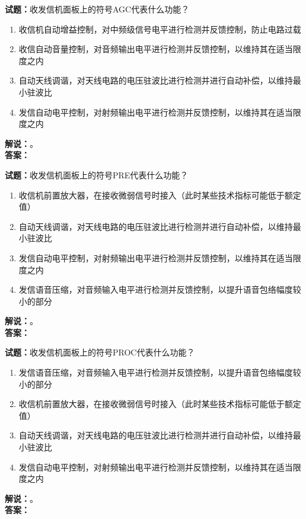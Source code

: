 \documentclass{ctexbook}
\begin{document}
\vspace{\baselineskip}

\noindent\textbf{试题：}收发信机面板上的符号AGC代表什么功能？
\begin{enumerate}[leftmargin=3em]
  \item 收信机自动增益控制，对中频级信号电平进行检测并反馈控制，防止电路过载
  \item 收信自动音量控制，对音频输出电平进行检测并反馈控制，以维持其在适当限度之内
  \item 自动天线调谐，对天线电路的电压驻波比进行检测并进行自动补偿，以维持最小驻波比
  \item 发信自动电平控制，对射频输出电平进行检测并反馈控制，以维持其在适当限度之内
\end{enumerate}
\noindent\textbf{解说：}\textbf{}。\\\noindent\textbf{答案：}

\vspace{\baselineskip}

\noindent\textbf{试题：}收发信机面板上的符号PRE代表什么功能？
\begin{enumerate}[leftmargin=3em]
  \item 收信机前置放大器，在接收微弱信号时接入（此时某些技术指标可能低于额定值）
  \item 自动天线调谐，对天线电路的电压驻波比进行检测并进行自动补偿，以维持最小驻波比
  \item 发信自动电平控制，对射频输出电平进行检测并反馈控制，以维持其在适当限度之内
  \item 发信语音压缩，对音频输入电平进行检测并反馈控制，以提升语音包络幅度较小的部分
\end{enumerate}
\noindent\textbf{解说：}\textbf{}。\\\noindent\textbf{答案：}

\vspace{\baselineskip}

\noindent\textbf{试题：}收发信机面板上的符号PROC代表什么功能？
\begin{enumerate}[leftmargin=3em]
  \item 发信语音压缩，对音频输入电平进行检测并反馈控制，以提升语音包络幅度较小的部分
  \item 收信机前置放大器，在接收微弱信号时接入（此时某些技术指标可能低于额定值）
  \item 自动天线调谐，对天线电路的电压驻波比进行检测并进行自动补偿，以维持最小驻波比
  \item 发信自动电平控制，对射频输出电平进行检测并反馈控制，以维持其在适当限度之内
\end{enumerate}
\noindent\textbf{解说：}\textbf{}。\\\noindent\textbf{答案：}
\end{document}
